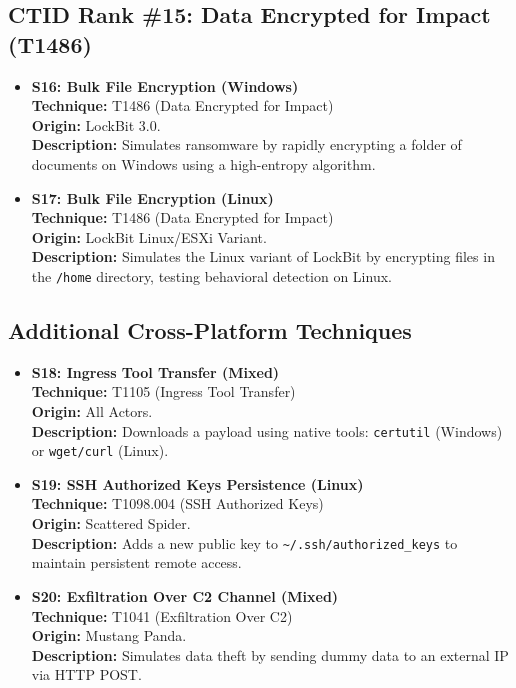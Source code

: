 \subsection{CTID Rank \#15: Data Encrypted for Impact (T1486)}
\begin{itemize}
    \item \textbf{S16: Bulk File Encryption (Windows)} \\
    \textbf{Technique:} T1486 (Data Encrypted for Impact) \\
    \textbf{Origin:} LockBit 3.0. \\
    \textbf{Description:} Simulates ransomware by rapidly encrypting a folder of documents on Windows using a high-entropy algorithm.

    \item \textbf{S17: Bulk File Encryption (Linux)} \\
    \textbf{Technique:} T1486 (Data Encrypted for Impact) \\
    \textbf{Origin:} LockBit Linux/ESXi Variant. \\
    \textbf{Description:} Simulates the Linux variant of LockBit by encrypting files in the \texttt{/home} directory, testing behavioral detection on Linux.
\end{itemize}

\subsection{Additional Cross-Platform Techniques}
\begin{itemize}
    \item \textbf{S18: Ingress Tool Transfer (Mixed)} \\
    \textbf{Technique:} T1105 (Ingress Tool Transfer) \\
    \textbf{Origin:} All Actors. \\
    \textbf{Description:} Downloads a payload using native tools: \texttt{certutil} (Windows) or \texttt{wget/curl} (Linux).

    \item \textbf{S19: SSH Authorized Keys Persistence (Linux)} \\
    \textbf{Technique:} T1098.004 (SSH Authorized Keys) \\
    \textbf{Origin:} Scattered Spider. \\
    \textbf{Description:} Adds a new public key to \texttt{\textasciitilde/.ssh/authorized\_keys} to maintain persistent remote access.

    \item \textbf{S20: Exfiltration Over C2 Channel (Mixed)} \\
    \textbf{Technique:} T1041 (Exfiltration Over C2) \\
    \textbf{Origin:} Mustang Panda. \\
    \textbf{Description:} Simulates data theft by sending dummy data to an external IP via HTTP POST.
\end{itemize}

